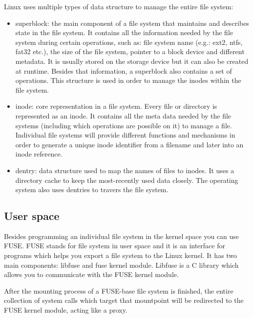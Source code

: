         Linux uses multiple types of data structure to manage the entire file system:
        \begin{itemize}
            \item superblock: the main component of a file system that maintains and describes state in the file system. It contains all the information needed by the file system during certain operations, such as: file system name (e.g.: ext2, ntfs, fat32 etc.), the size of the file system, pointer to a block device and different metadata. It is usually stored on the storage device but it can also be created at runtime. Besides that information, a superblock also contains a set of operations. This structure is used in order to manage the inodes within the file system.
            \item inode: core representation in a file system. Every file or directory is represented as an inode.
            It contains all the meta data needed by the file systems (including which operations are possible on it) to manage a file. Individual file systems will provide different functions and mechanisms in order to generate a unique inode identifier from a filename and later into an inode reference.
            \item dentry: data structure used to map the names of files to inodes. It uses a directory cache to keep the most-recently used data closely. The operating system also uses dentries to travers the file system.
        \end{itemize}

    \subsection{User space}
        Besides programming an individual file system in the kernel space you can use FUSE. FUSE stands for file system in user space and it is an interface for programs which helps you export a file system to the Linux kernel. It has two main components: libfuse and fuse kernel module. Libfuse is a C library which allows you to communicate with the FUSE kernel module.

        After the mounting process of a FUSE-base file system is finished, the entire collection of system calls which target that mountpoint will be redirected to the FUSE kernel module, acting like a proxy.

